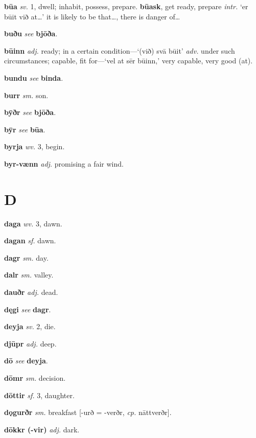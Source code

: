 \documentclass[12pt,letterpaper]{book}
\newcommand\emptypage{\clearpage{\pagestyle{empty}\cleardoublepage}}
\begin{document}
\noindent
\textbf{būa} \textit{sv.} 1, dwell; inhabit, possess, prepare.
	\textbf{būask}, get ready, prepare \textit{intr.} `er būit við at\ldots'
	it is likely to be that\ldots, there is danger of\ldots

\noindent
\textbf{buðu} \textit{} \textit{see} \textbf{bjōða}.

\noindent
\textbf{būinn} \textit{adj.} ready; in a certain condition---`(við) svā
	būit' \textit{adv.} under such circumstances; capable, fit for---`vel
	at sēr būinn,' very capable, very good (at).

\noindent
\textbf{bundu} \textit{} \textit{see} \textbf{binda}.

\noindent
\textbf{burr} \textit{sm.} son.

\noindent
\textbf{bȳðr} \textit{} \textit{see} \textbf{bjōða}.

\noindent
\textbf{bȳr} \textit{} \textit{see} \textbf{būa}.

\noindent
\textbf{byrja} \textit{wv.} 3, begin.

\noindent
\textbf{byr-vænn} \textit{adj.} promising a fair wind.

\emptypage

\chapter*{D}

\noindent
\textbf{daga} \textit{wv.} 3, dawn.

\noindent
\textbf{dagan} \textit{sf.} dawn.

\noindent
\textbf{dagr} \textit{sm.} day.

\noindent
\textbf{dalr} \textit{sm.} valley.

\noindent
\textbf{dauðr} \textit{adj.} dead.

\noindent
\textbf{dęgi} \textit{} \textit{see} \textbf{dagr}.

\noindent
\textbf{deyja} \textit{sv.} 2, die.

\noindent
\textbf{djūpr} \textit{adj.} deep.

\noindent
\textbf{dō} \textit{} \textit{see} \textbf{deyja}.

\noindent
\textbf{dōmr} \textit{sm.} decision.

\noindent
\textbf{dōttir} \textit{sf.} 3, daughter.

\noindent
\textbf{dǫgurðr} \textit{sm.} breakfast [-urð = -verðr, \textit{cp.} nāttverðr].

\noindent
\textbf{dōkkr (-vir)} \textit{adj.} dark.
\end{document}
